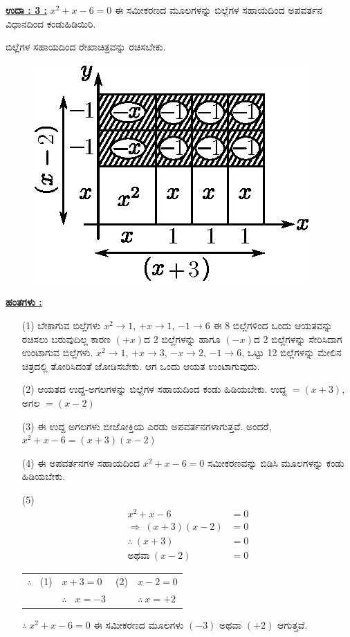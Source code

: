 \smallskip
\noindent
{\textbf{\underline{ಉದಾ : 3 :}}} $x^2 + x - 6 = 0$ ಈ ಸಮೀಕರಣದ ಮೂಲಗಳನ್ನು ಬಿಲ್ಲೆಗಳ ಸಹಾಯದಿಂದ ಅಪವರ್ತನ ವಿಧಾನದಿಂದ ಕಂಡುಹಿಡಿಯಿರಿ. 

ಬಿಲ್ಲೆಗಳ ಸಹಾಯದಿಂದ ರೇಖಾಚಿತ್ರವನ್ನು ರಚಿಸಬೇಕು.
\begin{figure}[H]
\centering
\includegraphics{src/figure/chap3/fig3-53.eps}
\end{figure}

\noindent
{\textbf{\underline{ಹಂತಗಳು :}}}
\begin{itemize}
\item [(1)] ಬೇಕಾಗುವ ಬಿಲ್ಲೆಗಳು $x^2 \rightarrow 1$, $+x \rightarrow 1$, $-1 \rightarrow 6$ ಈ 8 ಬಿಲ್ಲೆ\break ಗಳಿಂದ ಒಂದು ಆಯತವನ್ನು ರಚಿಸಲು ಬರುವುದಿಲ್ಲ ಕಾರಣ $(+x)$ದ 2 ಬಿಲ್ಲೆಗಳನ್ನು ಹಾಗೂ $(-x)$ದ 2 ಬಿಲ್ಲೆಗಳನ್ನು ಸೇರಿಸಿದಾಗ ಉಂಟಾಗುವ ಬಿಲ್ಲೆಗಳು. $x^2 \rightarrow 1$, $+x \rightarrow 3$, $-x \rightarrow 2$, $-1 \rightarrow 6$, ಒಟ್ಟು 12 ಬಿಲ್ಲೆಗಳನ್ನು ಮೇಲಿನ ಚಿತ್ರದಲ್ಲಿ ತೋರಿಸಿದಂತೆ ಜೋಡಿಸಬೇಕು. ಆಗ ಒಂದು ಆಯತ ಉಂಟಾಗುವುದು. 
\item [(2)] ಆಯತದ ಉದ್ದ-ಅಗಲಗಳನ್ನು ಬಿಲ್ಲೆಗಳ ಸಹಾಯದಿಂದ ಕಂಡು ಹಿಡಿಯಬೇಕು. ಉದ್ದ $= (x+3)$, ಅಗಲ $= (x-2)$
\item [(3)] ಈ ಉದ್ದ ಅಗಲಗಳು ಬೀಜೋಕ್ತಿಯ ಎರಡು ಅಪವರ್ತನಗಳಾಗುತ್ತವೆ. ಅಂದರೆ, $x^2 + x - 6 = (x+3)(x-2)$
\item [(4)] ಈ ಅಪವರ್ತನಗಳ ಸಹಾಯದಿಂದ $x^2 + x - 6 = 0$ ಸಮೀಕರಣವನ್ನು ಬಿಡಿಸಿ ಮೂಲಗಳನ್ನು ಕಂಡು ಹಿಡಿಯಬೇಕು. 
\item [(5)] 
\begin{align*}
x^2 + x - 6 & = 0\\
\Rightarrow~ (x+3)(x-2) & = 0\\
\therefore~ (x+3) & = 0\tag{1}\\
\text{ಅಥವಾ}~ (x-2) & = 0\tag{2}
\end{align*}

\begin{tabular}{llll}
$\therefore$~ (1) & $x + 3 = 0$ & (2) & $x-2 = 0$\\
& $\therefore$~ $x = -3$ & &$\therefore~ x = +2$
\end{tabular}


$\therefore~ x^2 + x - 6 = 0$ ಈ ಸಮೀಕರಣದ ಮೂಲಗಳು $(-3)$ ಅಥವಾ $(+2)$ ಆಗುತ್ತವೆ.
\end{itemize}

